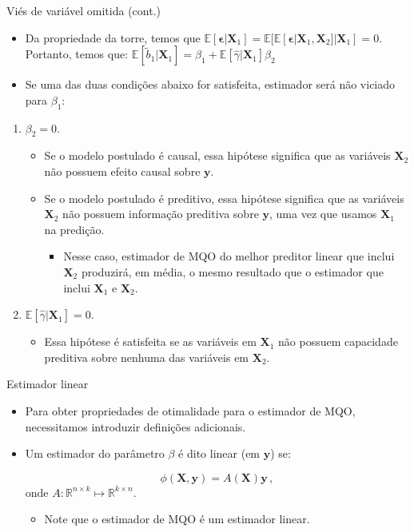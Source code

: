 \documentclass[11pt]{beamer}
\begin{document}
\begin{frame}{Viés de variável omitida (cont.)}
	\begin{itemize}
		\item Da propriedade da torre, temos que $\mathbb{E}[\boldsymbol{\epsilon}|\boldsymbol{X}_1] = \mathbb{E}[\mathbb{E}[\boldsymbol{\epsilon}|\boldsymbol{X}_1,\boldsymbol{X}_2] |\boldsymbol{X}_1] =0$. Portanto, temos que:
		$\mathbb{E}[\tilde{b}_1|\boldsymbol{X}_1]= \beta_1 + \mathbb{E}[\hat{\gamma}|\boldsymbol{X}_1]\beta_2$

	\item Se uma das duas condições abaixo for satisfeita, estimador será não viciado para $\beta_1$:
			\end{itemize}
	\begin{enumerate}
		\item $\beta_2=0$.
		\begin{itemize}
			\item Se o modelo postulado é causal, essa hipótese significa que as variáveis $\boldsymbol{X}_2$ não possuem efeito causal sobre $\boldsymbol{y}$.
			\item Se o modelo postulado é preditivo,  essa hipótese significa que as variáveis $\boldsymbol{X}_2$ não possuem informação preditiva sobre $\boldsymbol{y}$, uma vez que usamos $\boldsymbol{X}_1$ na predição.
			\begin{itemize}
				\item Nesse caso, estimador de MQO do melhor preditor linear que inclui $\boldsymbol{X}_2$  produzirá, em média, o mesmo resultado que o estimador que inclui $\boldsymbol{X}_1$ e $\boldsymbol{X}_2$.
			\end{itemize}
		\end{itemize}
		\item $\mathbb{E}[\hat{\gamma}|\boldsymbol{X}_1]=0$.
		\begin{itemize}
			\item Essa hipótese é satisfeita se as variáveis em $\boldsymbol{X}_1$ não possuem capacidade preditiva sobre nenhuma das variáveis em $\boldsymbol{X}_2$.
		\end{itemize}
	\end{enumerate}

\end{frame}

\begin{frame}{Estimador linear}
\begin{itemize}
	\item Para obter propriedades de otimalidade para o estimador de MQO, necessitamos introduzir definições adicionais.
	\item Um estimador do parâmetro $\beta$ é dito {\color{red}linear} (em $\boldsymbol{y}$) se:
	
	$$\phi(\boldsymbol{X},\boldsymbol{y}) = A(\boldsymbol{X})\boldsymbol{y}\,,$$
	onde $A: \mathbb{R}^{n\times k} \mapsto \mathbb{R}^{k\times n}$.
	\begin{itemize}
		\item Note que o estimador de MQO é um estimador linear.
	\end{itemize}
	
	
\end{itemize}
\end{frame}
\end{document}
